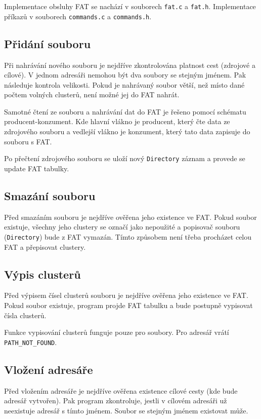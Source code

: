 \documentclass[11pt,a4paper]{scrartcl}
\begin{document}
	Implementace obsluhy FAT se nachází v souborech \verb|fat.c| a \verb|fat.h|. Implementace příkazů v souborech \verb|commands.c| a \verb|commands.h|.
	
	\subsection{Přidání souboru}
	Při nahrávání nového souboru je nejdříve zkontrolována platnost cest (zdrojové a cílové). V jednom adresáři nemohou být dva soubory se stejným jménem. Pak následuje kontrola velikosti. Pokud je nahrávaný soubor větší, než místo dané počtem volných clusterů, není možné jej do FAT nahrát.
	
	Samotné čtení ze souboru a nahrávání dat do FAT je řešeno pomocí schématu producent-konzument. Kde hlavní vlákno je producent, který čte data ze zdrojového souboru a vedlejší vlákno je konzument, který tato data zapisuje do souboru s FAT.
	
	Po přečtení zdrojového souboru se uloží nový \verb|Directory| záznam a provede se update FAT tabulky.
	
	\subsection{Smazání souboru}
	Před smazáním souboru je nejdříve ověřena jeho existence ve FAT. Pokud soubor existuje, všechny jeho clustery se označí jako nepoužité a popisovač souboru (\verb|Directory|) bude z FAT vymazán. Tímto způsobem není třeba procházet celou FAT a přepisovat clustery.
	
	\subsection{Výpis clusterů}
	Před výpisem čísel clusterů souboru je nejdříve ověřena jeho existence ve FAT. Pokud soubor existuje, program projde FAT tabulku a bude postupně vypisovat čísla clusterů.
	
	Funkce vypisování clusterů funguje pouze pro soubory. Pro adresář vrátí \verb|PATH_NOT_FOUND|.
	
	\subsection{Vložení adresáře}
	Před vložením adresáře je nejdříve ověřena existence cílové cesty (kde bude adresář vytvořen). Pak program zkontroluje, jestli v cílovém adresáři už neexistuje adresář s tímto jménem. Soubor se stejným jménem existovat může.
	
\end{document}

